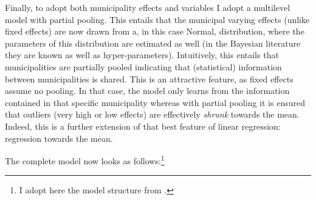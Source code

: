 \documentclass[fleqn,10pt]{SelfArx} %
\begin{document}
        Finally, to adopt both municipality effects and variables I adopt a
        multilevel model with partial pooling. This entails that the
        municipal varying effects (unlike fixed effects) are now
        drawn from a, in this case Normal, distribution, where the
        parameters of this distribution are estimated as well (in the
        Bayesian literature they are known as well as hyper-parameters). 
        Intuitively, this entails that municipalities are partially pooled 
        indicating that (statistical) information between municipalities is shared. This is an attractive feature, as fixed effects assume no
        pooling. In that case, the model only learns from the information contained
        in that specific municipality whereas with partial pooling it is ensured that
        outliers (very high or low effects) are effectively
        \emph{shrunk} towards the mean. Indeed, this is a further
        extension of that best feature of linear regression:
        regression towards the mean.

        The complete model now looks as follows:\footnote{I adopt here the model structure from \citet{mcelreath2018statistical}.}
        
\end{document}
